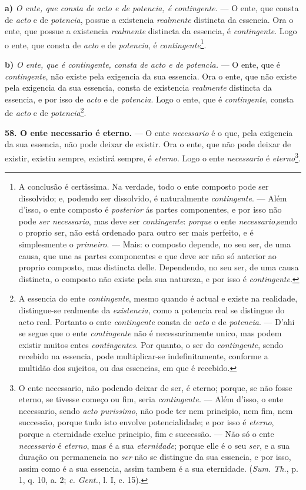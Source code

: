 \textbf{a)} \emph{O ente, que consta de acto e de potencia, é contingente.} --- O ente, que consta de \emph{acto} e de \emph{potencia}, possue a existencia \emph{realmente} distincta da essencia. Ora o ente, que possue a existencia \emph{realmente} distincta da essencia, é \emph{contingente}. Logo o ente, que consta de \emph{acto} e de \emph{potencia}, é \emph{contingente}\footnote{A conclusão é certissima. Na verdade, todo o ente composto pode ser dissolvido; e, podendo ser dissolvido, é naturalmente \emph{contingente}. --- Além d'isso, o ente composto é \emph{posterior} ás partes componentes, e por isso não pode \emph{ser necessario}, mas deve ser \emph{contingente}: \emph{porque} o ente \emph{necessario},sendo o proprio ser, não está ordenado para outro ser mais perfeito, e é simplesmente o \emph{primeiro}. --- Mais: o composto depende, no seu ser, de uma causa, que une as partes componentes e que deve ser não só anterior ao proprio composto, mas distincta delle. Dependendo, no seu ser, de uma causa distincta, o composto não existe pela sua natureza, e por isso é \emph{contingente}.}.

 \textbf{b)} \emph{O ente, que é contingente, consta de acto e de potencia.} --- O ente, que é \emph{contingente}, não existe pela exigencia da sua essencia. Ora o ente, que não existe pela exigencia da sua essencia, consta de existencia \emph{realmente} distincta da essencia, e por isso de \emph{acto} e de \emph{potencia}. Logo o ente, que é \emph{contingente}, consta de \emph{acto} e de \emph{potencia}\footnote{A essencia do ente \emph{contingente}, mesmo quando é actual e existe na realidade, distingue-se realmente da \emph{existencia}, como a potencia real se distingue do acto real. Portanto o ente \emph{contingente} consta de \emph{acto} e de \emph{potencia}. --- D'ahi se segue que o ente \emph{contingente} não é necessariamente unico, mas podem existir muitos entes \emph{contingentes}. Por quanto, o ser do \emph{contingente}, sendo recebido na essencia, pode multiplicar-se indefinitamente, conforme a multidão dos sujeitos, ou das essencias, em que é recebido.}.

\textbf{58. O ente necessario é eterno.} --- O ente \emph{necessario} é o que, pela exigencia da sua essencia, não pode deixar de existir. Ora o ente, que não pode deixar de existir, existiu sempre, existirá sempre, é \emph{eterno}. Logo o ente \emph{necessario} é \emph{eterno}\footnote{O ente necessario, não podendo deixar de ser, é eterno; porque, se não fosse eterno, se tivesse começo ou fim, seria \emph{contingente}. --- Além d'isso, o ente necessario, sendo \emph{acto purissimo}, não pode ter nem principio, nem fim, nem successão, porque tudo isto envolve potencialidade; e por isso é \emph{eterno}, porque a eternidade exclue principio, fim e successão. --- Não só o ente \emph{necessario} é \emph{eterno}, mas é a sua \emph{eternidade}; porque elle é o seu \emph{ser}, e a sua duração ou permanencia no \emph{ser} não se distingue da sua essencia, e por isso, assim como é a sua essencia, assim tambem é a sua eternidade. (\emph{Sum. Th.}, p. 1, q. 10, a. 2; \emph{c. Gent.}, l. I, c. 15).}.

